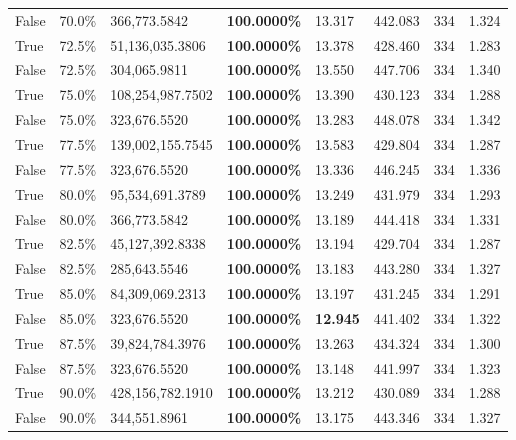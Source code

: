 \begin{table}[H]
\begin{tabular}{lllrllll}
\cline{1-8}
False & 70.0\% & 366,773.5842 & \bfseries \color{red} 100.0000\% & 13.317 & 442.083 & 334 & 1.324 \\
\cline{1-8}
True & 72.5\% & 51,136,035.3806 & \bfseries \color{red} 100.0000\% & 13.378 & 428.460 & 334 & 1.283 \\
\cline{1-8}
False & 72.5\% & 304,065.9811 & \bfseries \color{red} 100.0000\% & 13.550 & 447.706 & 334 & 1.340 \\
\cline{1-8}
True & 75.0\% & 108,254,987.7502 & \bfseries \color{red} 100.0000\% & 13.390 & 430.123 & 334 & 1.288 \\
\cline{1-8}
False & 75.0\% & 323,676.5520 & \bfseries \color{red} 100.0000\% & 13.283 & 448.078 & 334 & 1.342 \\
\cline{1-8}
True & 77.5\% & 139,002,155.7545 & \bfseries \color{red} 100.0000\% & 13.583 & 429.804 & 334 & 1.287 \\
\cline{1-8}
False & 77.5\% & 323,676.5520 & \bfseries \color{red} 100.0000\% & 13.336 & 446.245 & 334 & 1.336 \\
\cline{1-8}
True & 80.0\% & 95,534,691.3789 & \bfseries \color{red} 100.0000\% & 13.249 & 431.979 & 334 & 1.293 \\
\cline{1-8}
False & 80.0\% & 366,773.5842 & \bfseries \color{red} 100.0000\% & 13.189 & 444.418 & 334 & 1.331 \\
\cline{1-8}
True & 82.5\% & 45,127,392.8338 & \bfseries \color{red} 100.0000\% & 13.194 & 429.704 & 334 & 1.287 \\
\cline{1-8}
False & 82.5\% & \color{red} 285,643.5546 & \bfseries \color{red} 100.0000\% & 13.183 & 443.280 & 334 & 1.327 \\
\cline{1-8}
True & 85.0\% & 84,309,069.2313 & \bfseries \color{red} 100.0000\% & 13.197 & 431.245 & 334 & 1.291 \\
\cline{1-8}
False & 85.0\% & 323,676.5520 & \bfseries \color{red} 100.0000\% & \bfseries \color{red} 12.945 & 441.402 & 334 & 1.322 \\
\cline{1-8}
True & 87.5\% & 39,824,784.3976 & \bfseries \color{red} 100.0000\% & 13.263 & 434.324 & 334 & 1.300 \\
\cline{1-8}
False & 87.5\% & 323,676.5520 & \bfseries \color{red} 100.0000\% & 13.148 & 441.997 & 334 & 1.323 \\
\cline{1-8}
True & 90.0\% & 428,156,782.1910 & \bfseries \color{red} 100.0000\% & 13.212 & 430.089 & 334 & 1.288 \\
\cline{1-8}
False & 90.0\% & 344,551.8961 & \bfseries \color{red} 100.0000\% & 13.175 & 443.346 & 334 & 1.327 \\

\end{tabular}
\end{table}

